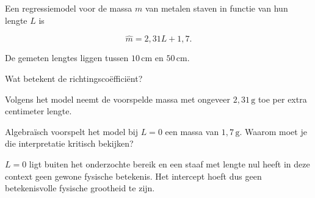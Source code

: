 \documentclass{ximera}
\begin{document}
\begin{oefening}{\oefU \ESS}

Een regressiemodel voor de massa $m$ van metalen staven in functie van
hun lengte $L$ is

\[
\hat m=2{,}31L+1{,}7.
\]

De gemeten lengtes liggen tussen $10\,\mathrm{cm}$ en
$50\,\mathrm{cm}$.

\begin{question}
Wat betekent de richtingscoëfficiënt?

\begin{oplossing}
Volgens het model neemt de voorspelde massa met ongeveer
$2{,}31\,\mathrm g$ toe per extra centimeter lengte.
\end{oplossing}
\end{question}

\begin{question}
Algebraïsch voorspelt het model bij $L=0$ een massa van
$1{,}7\,\mathrm g$. Waarom moet je die interpretatie kritisch bekijken?

\begin{oplossing}
$L=0$ ligt buiten het onderzochte bereik en een staaf met lengte nul
heeft in deze context geen gewone fysische betekenis. Het intercept
hoeft dus geen betekenisvolle fysische grootheid te zijn.
\end{oplossing}
\end{question}
\end{oefening}
\end{document}
